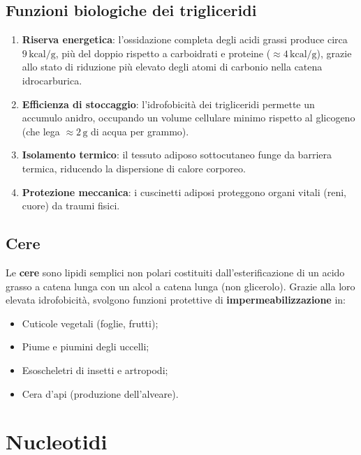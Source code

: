 \documentclass[12pt,a4paper]{report}
\begin{document}
\section{Funzioni biologiche dei trigliceridi}
\begin{enumerate}
\item \textbf{Riserva energetica}: l'ossidazione completa degli acidi grassi produce circa \(9\,\mathrm{kcal/g}\), più del doppio rispetto a carboidrati e proteine (\(\approx 4\,\mathrm{kcal/g}\)), grazie allo stato di riduzione più elevato degli atomi di carbonio nella catena idrocarburica.
\item \textbf{Efficienza di stoccaggio}: l'idrofobicità dei trigliceridi permette un accumulo anidro, occupando un volume cellulare minimo rispetto al glicogeno (che lega \(\approx 2\,\mathrm{g}\) di acqua per grammo).
\item \textbf{Isolamento termico}: il tessuto adiposo sottocutaneo funge da barriera termica, riducendo la dispersione di calore corporeo.
\item \textbf{Protezione meccanica}: i cuscinetti adiposi proteggono organi vitali (reni, cuore) da traumi fisici.
\end{enumerate}

\section{Cere}
Le \textbf{cere} sono lipidi semplici non polari costituiti dall'esterificazione di un acido grasso a catena lunga con un alcol a catena lunga (non glicerolo). Grazie alla loro elevata idrofobicità, svolgono funzioni protettive di \textbf{impermeabilizzazione} in:
\begin{itemize}
\item Cuticole vegetali (foglie, frutti);
\item Piume e piumini degli uccelli;
\item Esoscheletri di insetti e artropodi;
\item Cera d'api (produzione dell'alveare).
\end{itemize}

\chapter{Nucleotidi}
\end{document}
